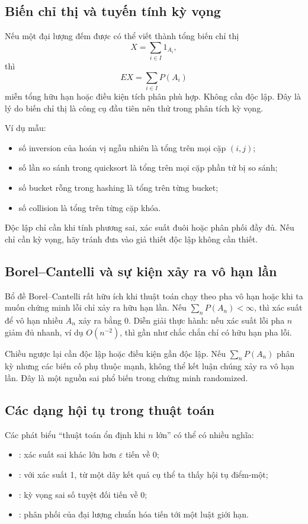 \documentclass[11pt]{article}
\begin{document}
\subsection{Biến chỉ thị và tuyến tính kỳ vọng}

Nếu một đại lượng đếm được có thể viết thành tổng biến chỉ thị
\[
  X=\sum_{i\in I}1_{A_i},
\]
thì
\[
  E X=\sum_{i\in I}P(A_i)
\]
miễn tổng hữu hạn hoặc điều kiện tích phân phù hợp. Không cần độc lập. Đây là
lý do biến chỉ thị là công cụ đầu tiên nên thử trong phân tích kỳ vọng.

Ví dụ mẫu:
\begin{itemize}
  \item số inversion của hoán vị ngẫu nhiên là tổng trên mọi cặp \((i,j)\);
  \item số lần so sánh trong quicksort là tổng trên mọi cặp phần tử bị so sánh;
  \item số bucket rỗng trong hashing là tổng trên từng bucket;
  \item số collision là tổng trên từng cặp khóa.
\end{itemize}

Độc lập chỉ cần khi tính phương sai, xác suất đuôi hoặc phân phối đầy đủ. Nếu
chỉ cần kỳ vọng, hãy tránh đưa vào giả thiết độc lập không cần thiết.

\subsection{Borel--Cantelli và sự kiện xảy ra vô hạn lần}

Bổ đề Borel--Cantelli rất hữu ích khi thuật toán chạy theo pha vô hạn hoặc khi
ta muốn chứng minh lỗi chỉ xảy ra hữu hạn lần. Nếu \(\sum_n P(A_n)<\infty\),
thì xác suất để vô hạn nhiều \(A_n\) xảy ra bằng 0. Diễn giải thực hành: nếu xác
suất lỗi pha \(n\) giảm đủ nhanh, ví dụ \(O(n^{-2})\), thì gần như chắc chắn chỉ
có hữu hạn pha lỗi.

Chiều ngược lại cần độc lập hoặc điều kiện gần độc lập. Nếu \(\sum_n P(A_n)\)
phân kỳ nhưng các biến cố phụ thuộc mạnh, không thể kết luận chúng xảy ra vô
hạn lần. Đây là một nguồn sai phổ biến trong chứng minh randomized.

\subsection{Các dạng hội tụ trong thuật toán}

Các phát biểu ``thuật toán ổn định khi \(n\) lớn'' có thể có nhiều nghĩa:
\begin{itemize}
  \item {}: xác suất sai khác lớn hơn \(\varepsilon\)
        tiến về 0;
  \item {}: với xác suất 1, từ một dãy kết quả cụ thể
        ta thấy hội tụ điểm-một;
  \item {}: kỳ vọng sai số tuyệt đối tiến về 0;
  \item {}: phân phối của đại lượng chuẩn hóa tiến
        tới một luật giới hạn.
\end{itemize}
\end{document}

